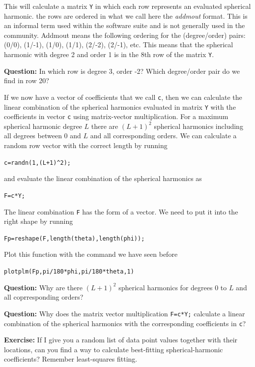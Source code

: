\documentclass[11pt]{article}
\begin{document}
This will calculate a matrix \verb+Y+ in which each row represents an
evaluated spherical harmonic. the rows are ordered in what we call
here the \emph{addmout} format. This is an informal term used within
the software suite and is not generally used in the community. Addmout
means the following ordering for the (degree/order) pairs: (0/0),
(1/-1), (1/0), (1/1), (2/-2), (2/-1), etc. This means that the
spherical harmonic with degree 2 and order 1 is in the 8th row of the
matrix \verb+Y+.
   
\textbf{Question:} In which row is degree 3, order -2? Which
degree/order pair do we find in row 20?

If we now have a vector of coefficients that we call \verb+c+, then we
can calculate the linear combination of the spherical harmonics
evaluated in matrix \verb+Y+ with the coefficients in vector \verb+c+
using matrix-vector multiplication. For a maximum spherical harmonic
degree $L$ there are $(L+1)^2$ spherical harmonics including all
degrees between 0 and $L$ and all corresponding orders.  We can
calculate a random row vector with the correct length by running

\quad \verb!c=randn(1,(L+1)^2);!
   
and evaluate the linear combination of the spherical harmonics as

\quad \verb!F=c*Y;!

The linear combination \verb!F! has the form of a vector. We need to
put it into the right shape by running

\quad \verb!Fp=reshape(F,length(theta),length(phi));!

Plot this function with the command we have seen before

\qquad \verb+plotplm(Fp,pi/180*phi,pi/180*theta,1)+

\textbf{Question:} Why are there $(L+1)^2$ spherical harmonics for
degrees 0 to $L$ and all coprresponding orders?

\textbf{Question:} Why does the matrix vector multiplication
\verb!F=c*Y;! calculate a linear combination of the spherical
harmonics with the corresponding coefficients in \verb+c+?


\textbf{Exercise:} If I give you a random list of data point values
together with their locations, can you find a way to calculate
best-fitting spherical-harmonic coefficients? Remember least-squares
fitting.
\end{document}
